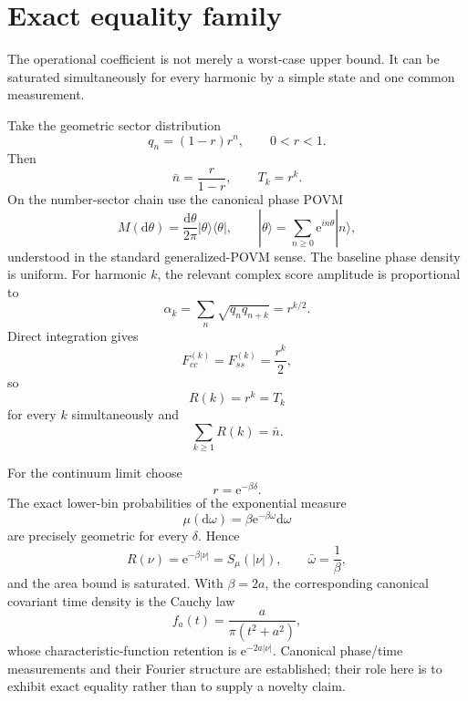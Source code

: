 \documentclass[aps,pra,reprint,amsmath,amssymb,longbibliography]{revtex4-2}
\newcommand{\dd}{\mathrm{d}}
\newcommand{\e}{\mathrm{e}}
\begin{document}
\section{Exact equality family}
\label{sec:equality}

The operational coefficient is not merely a worst-case upper bound.  It can be saturated simultaneously for every harmonic by a simple state and one common measurement.

Take the geometric sector distribution
\begin{equation}
 q_n=(1-r)r^n,
 \qquad 0<r<1.
 \label{eq:geometric}
\end{equation}
Then
\begin{equation}
 \bar n=\frac{r}{1-r},
 \qquad
 T_k=r^k.
\end{equation}
On the number-sector chain use the canonical phase POVM
\begin{equation}
 M(\dd\theta)=\frac{\dd\theta}{2\pi}|\theta\rangle\langle\theta|,
 \qquad
 |\theta\rangle=\sum_{n\geq0}\e^{in\theta}|n\rangle,
 \label{eq:canonical-phase}
\end{equation}
understood in the standard generalized-POVM sense.  The baseline phase density is uniform.  For harmonic $k$, the relevant complex score amplitude is proportional to
\begin{equation}
 \alpha_k=\sum_n\sqrt{q_nq_{n+k}}=r^{k/2}.
\end{equation}
Direct integration gives
\begin{equation}
 F_{cc}^{(k)}=F_{ss}^{(k)}=\frac{r^k}{2},
\end{equation}
so
\begin{equation}
 \boxed{R(k)=r^k=T_k}
 \label{eq:discrete-equality}
\end{equation}
for every $k$ simultaneously and
\begin{equation}
 \sum_{k\geq1}R(k)=\bar n.
\end{equation}

For the continuum limit choose
\begin{equation}
 r=\e^{-\beta\delta}.
\end{equation}
The exact lower-bin probabilities of the exponential measure
\begin{equation}
 \mu(\dd\omega)=\beta\e^{-\beta\omega}\dd\omega
 \label{eq:exp-spectrum}
\end{equation}
are precisely geometric for every $\delta$.  Hence
\begin{equation}
 R(\nu)=\e^{-\beta|\nu|}=S_\mu(|\nu|),
 \qquad
 \bar\omega=\frac1\beta,
 \label{eq:continuum-equality}
\end{equation}
and the area bound is saturated.  With $\beta=2a$, the corresponding canonical covariant time density is the Cauchy law
\begin{equation}
 f_a(t)=\frac{a}{\pi(t^2+a^2)},
 \label{eq:Cauchy}
\end{equation}
whose characteristic-function retention is $\e^{-2a|\nu|}$.  Canonical phase/time measurements and their Fourier structure are established; their role here is to exhibit exact equality rather than to supply a novelty claim.
\end{document}
